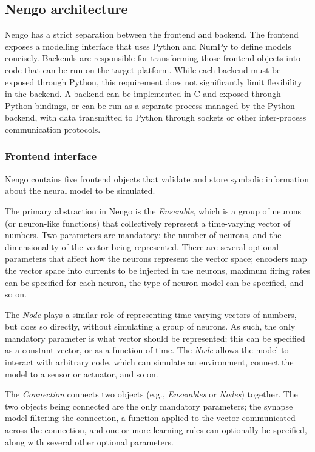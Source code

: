 \documentclass{frontiersSCNS}
\begin{document}
\subsection{Nengo architecture}

Nengo has a strict separation between
the frontend and backend.
The frontend exposes a modelling interface
that uses Python and NumPy \cite{???}
to define models concisely.
Backends are responsible for transforming
those frontend objects into code that
can be run on the target platform.
While each backend must be exposed
through Python, this requirement
does not significantly limit
flexibility in the backend.
A backend can be implemented in C and exposed
through Python bindings,
or can be run as a separate process
managed by the Python backend,
with data transmitted to Python through sockets
or other inter-process communication protocols.

\subsubsection{Frontend interface}

Nengo contains five frontend objects
that validate and store symbolic information
about the neural model to be simulated.

The primary abstraction in Nengo is the \textit{Ensemble},
which is a group of neurons (or neuron-like functions)
that collectively represent a time-varying vector of numbers.
Two parameters are mandatory: the number of neurons,
and the dimensionality of the vector being represented.
There are several optional parameters that
affect how the neurons represent the vector space;
encoders map the vector space into currents
to be injected in the neurons,
maximum firing rates can be specified for each neuron,
the type of neuron model can be specified,
and so on.

The \textit{Node} plays a similar role of representing
time-varying vectors of numbers,
but does so directly, without simulating a group of neurons.
As such, the only mandatory parameter
is what vector should be represented;
this can be specified as a constant vector,
or as a function of time.
The \textit{Node} allows the model to
interact with arbitrary code,
which can simulate an environment,
connect the model to a sensor or actuator,
and so on.

The \textit{Connection} connects two objects
(e.g., \textit{Ensembles} or \textit{Nodes}) together.
The two objects being connected are the only mandatory parameters;
the synapse model filtering the connection,
a function applied to the vector
communicated across the connection,
and one or more learning rules
can optionally be specified,
along with several other optional parameters.
\end{document}
